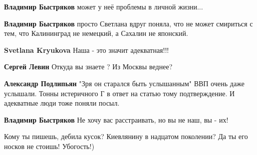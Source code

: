 \begin{itemize}
\begin{itemize}
\textbf{Владимир Быстряков} может у неё проблемы в личной жизни...

 
\textbf{Владимир Быстряков} просто Светлана вдруг поняла, что не может смириться с тем, что Калининград не немецкий, а Сахалин не японский.

 
\textbf{Svetlana Kryukova} Наша - это значит адекватная!!!

 
\textbf{Сергей Левин} Откуда вы знаете ? Из Москвы веднее?

 
\textbf{Александр Подлипьян} "Зря он старался быть услышанным"
ВВП очень даже услышали. Тонны истеричного Г в ответ на статью тому подтверждение. И адекватные люди тоже поняли посыл.

 
\textbf{Владимир Быстряков} Не хочу вас расстраивать, но вы не наш, вы - их!

 
Кому ты пишешь, дебила кусок? Киевлянину в надцатом поколении? Да ты его носков не стоишь! Убогость!)


\end{itemize}
\end{itemize}
